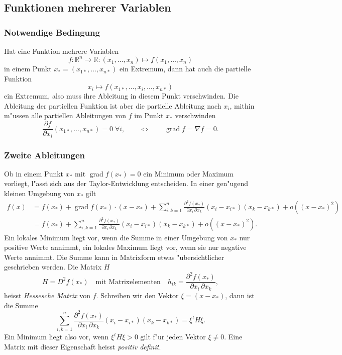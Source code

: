 \subsection{Funktionen mehrerer Variablen\label{nlp:extremwerte:mehrerevariable}}
\subsubsection{Notwendige Bedingung}
Hat eine Funktion mehrere Variablen
\[
f\colon\mathbb R^n\to\mathbb R:(x_1,\dots,x_n)\mapsto f(x_1,\dots,x_n)
\]
in einem Punkt $x_*=(x_{1*},\dots,x_{n*})$ ein Extremum,
dann hat auch die partielle Funktion
\[
x_i\mapsto f(x_{1*},\dots,x_i,\dots,x_{n*})
\]
ein Extremum, also muss ihre Ableitung in diesem Punkt
verschwinden. Die Ableitung der partiellen Funktion ist aber
die partielle Ableitung nach $x_i$, mithin m"ussen
alle partiellen Ableitungen von $f$ im Punkt $x_*$ verschwinden
\begin{equation}
\frac{\partial f}{\partial x_i}(x_{1*},\dots,x_{n*})=0\;\forall i,
\qquad \Leftrightarrow\qquad
\operatorname{grad}f=\nabla f=0.
\end{equation}

\subsubsection{Zweite Ableitungen}
Ob in einem Punkt $x_*$ mit $\operatorname{grad}f(x_*)=0$ ein
Minimum oder Maximum vorliegt, l"asst sich aus der Taylor-Entwicklung
entscheiden. In einer gen"ugend kleinen Umgebung von $x_*$ gilt
\begin{align*}
f(x)&=f(x_*)+\operatorname{grad}f(x_*)\cdot (x-x_*)+
\sum_{i,k=1}^n\frac{\partial^2 f(x_*)}{\partial x_i\,\partial x_k}(x_i-x_{i*})(x_k-x_{k*})+o((x-x_*)^2)
\\
&=f(x_*)+
\sum_{i,k=1}^n\frac{\partial^2 f(x_*)}{\partial x_i\,\partial x_k}(x_i-x_{i*})(x_k-x_{k*})
+o((x-x_*)^2).
\end{align*}
Ein lokales Minimum liegt vor, wenn die Summe in einer Umgebung
von $x_*$ nur positive Werte annimmt, ein lokales Maximum liegt vor,
wenn sie nur negative Werte annimmt.
Die Summe kann in Matrixform etwas "ubersichtlicher geschrieben werden.
Die Matrix $H$
\begin{equation}
H=D^2f(x_*) \quad\text{mit Matrixelementen}\quad
h_{ik}=
\frac{\partial^2 f(x_*)}{\partial x_i\,\partial x_k},
\end{equation}
heisst {\it Hessesche Matrix} von $f$.
Schreiben wir den Vektor $\xi = (x-x_*)$, dann ist die Summe
\[
\sum_{i,k=1}^n\frac{\partial^2 f(x_*)}{\partial x_i\,\partial x_k}(x_i-x_{i*})(x_k-x_{k*})
=\xi^tH\xi.
\]
Ein Minimum liegt also vor,
wenn $\xi^t H\xi > 0$ gilt f"ur jeden Vektor $\xi\ne 0$.
Eine Matrix mit dieser Eigenschaft heisst {\it positiv definit}.

